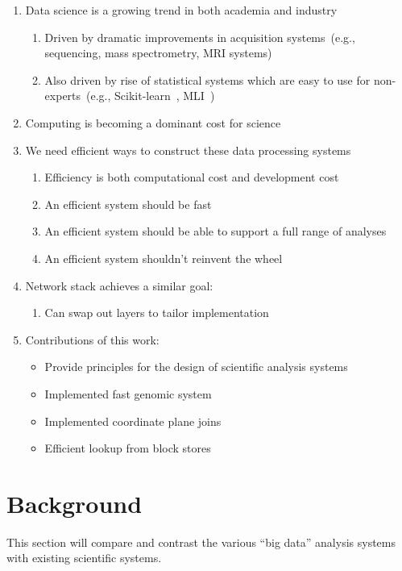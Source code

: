 \documentclass{acm_proc_article-sp}
\begin{document}
\begin{enumerate}
\item Data science is a growing trend in both academia and industry
\begin{enumerate}
\item Driven by dramatic improvements in acquisition systems~(e.g., sequencing, mass spectrometry,
MRI systems)
\item Also driven by rise of statistical systems which are easy to use for non-experts~(e.g.,
Scikit-learn~\cite{pedregosa11}, MLI~\cite{sparks13})
\end{enumerate}
\item Computing is becoming a dominant cost for science
\item We need efficient ways to construct these data processing systems
\begin{enumerate}
\item Efficiency is both computational cost and development cost
\item An efficient system should be fast
\item An efficient system should be able to support a full range of analyses
\item An efficient system shouldn't reinvent the wheel
\end{enumerate}
\item Network stack achieves a similar goal:
\begin{enumerate}
\item Can swap out layers to tailor implementation
\end{enumerate}
\item Contributions of this work:
\begin{itemize}
\item Provide principles for the design of scientific analysis systems
\item Implemented fast genomic system
\item Implemented coordinate plane joins
\item Efficient lookup from block stores
\end{itemize}
\end{enumerate}

\section{Background}
\label{sec:background}

This section will compare and contrast the various ``big data'' analysis systems with existing
scientific systems.
\end{document}
